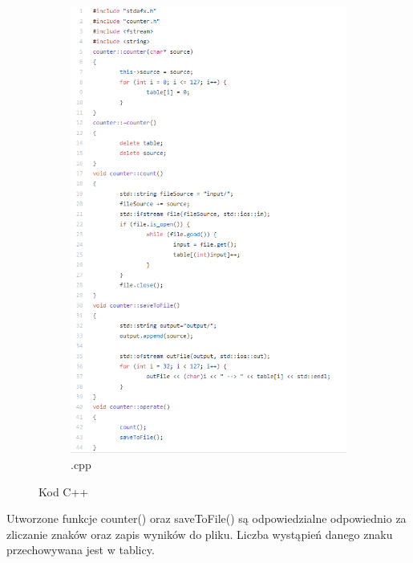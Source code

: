 \documentclass[]{article}
\begin{document}
\begin{figure}[H]
\begin{subfigure}{.5\textwidth}
		\includegraphics[width=1.3\linewidth]{cpp_code}
		\caption{.cpp}
		\label{fig:sub2}
	\end{subfigure}
	\caption{Kod C++}
	\label{fig:test}
\end{figure}
Utworzone funkcje counter() oraz saveToFile() są odpowiedzialne odpowiednio za zliczanie znaków oraz zapis wyników do pliku. Liczba wystąpień danego znaku przechowywana jest w tablicy.
\end{document}
